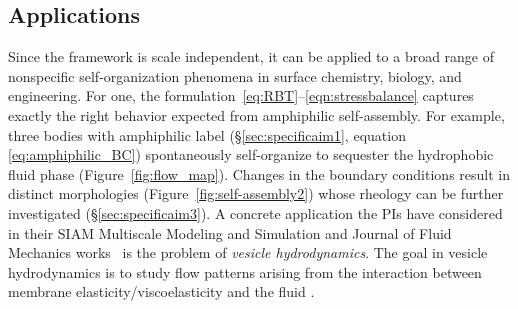 \subsection{Applications}
Since the framework is scale independent, it can be applied to a broad
range of nonspecific self-organization phenomena in surface chemistry,
biology, and engineering. For one, the
formulation~\eqref{eq:RBT}--\eqref{eqn:stressbalance} captures exactly
the right behavior expected from amphiphilic self-assembly. For example,
three bodies with amphiphilic label (\S\ref{sec:specificaim1}, equation
\eqref{eq:amphiphilic_BC}) spontaneously self-organize to sequester the
hydrophobic fluid phase (Figure~\ref{fig:flow_map}). Changes in the
boundary conditions result in distinct morphologies
(Figure~\ref{fig:self-assembly2}) whose rheology can be further
investigated (\S\ref{sec:specificaim3}).
%
A concrete application the PIs have considered in their SIAM Multiscale
Modeling and Simulation and Journal of Fluid Mechanics
works~\cite{Fu2018_SIAM, FuQuRyYo22} is the problem of \emph{vesicle
hydrodynamics}.
The
goal in vesicle hydrodynamics is to study flow patterns arising from the
interaction between membrane elasticity/viscoelasticity and the fluid
\cite{Gera2022SwingingAT,Cox2015TheEO,wangthesis,C6SM02452A,Strychalski2012ViscoelasticIB}.


